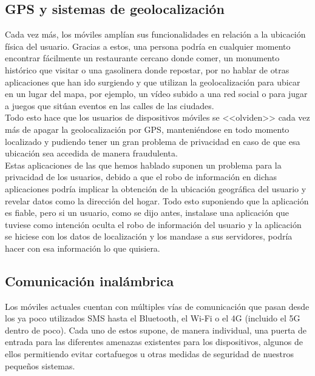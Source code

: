 \documentclass[11pt]{article}
\begin{document}
\subsection{GPS y sistemas de geolocalización}

{Cada vez más, los móviles amplían sus funcionalidades en relación a la ubicación física del usuario. Gracias a estos, una persona podría en cualquier momento encontrar fácilmente un restaurante cercano donde comer, un monumento histórico que visitar o una gasolinera donde repostar, por no hablar de otras aplicaciones que han ido surgiendo y que utilizan la geolocalización para ubicar en un lugar del mapa, por ejemplo, un vídeo subido a una red social o para jugar a juegos que sitúan eventos en las calles de las ciudades.} \\

{Todo esto hace que los usuarios de dispositivos móviles se <<olviden>> cada vez más de apagar la geolocalización por GPS, manteniéndose en todo momento localizado y pudiendo tener un gran problema de privacidad en caso de que esa ubicación sea accedida de manera fraudulenta.} \\

{Estas aplicaciones de las que hemos hablado suponen un problema para la privacidad de los usuarios, debido a que el robo de información en dichas aplicaciones podría implicar la obtención de la ubicación geográfica del usuario y revelar datos como la dirección del hogar. Todo esto suponiendo que la aplicación es fiable, pero si un usuario, como se dijo antes, instalase una aplicación que tuviese como intención oculta el robo de información del usuario y la aplicación se hiciese con los datos de localización y los mandase a sus servidores, podría hacer con esa información lo que quisiera.}

\subsection{Comunicación inalámbrica}

{Los móviles actuales cuentan con múltiples vías de comunicación que pasan desde los ya poco utilizados SMS hasta el Bluetooth, el Wi-Fi o el 4G (incluido el 5G dentro de poco). Cada uno de estos supone, de manera individual, una puerta de entrada para las diferentes amenazas existentes para los dispositivos, algunos de ellos permitiendo evitar cortafuegos u otras medidas de seguridad de nuestros pequeños sistemas.} \\
\end{document}
